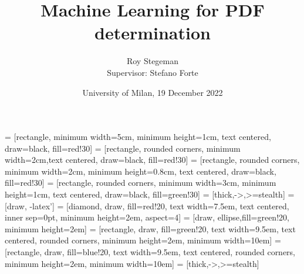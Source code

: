 

\title{
  Machine Learning for PDF determination
}
\date{University of Milan, 19 December 2022}
\author{
  Roy Stegeman \\[0.1cm]
  Supervisor: Stefano Forte
}


\usetikzlibrary{shapes, arrows}
\usetikzlibrary{decorations.pathreplacing}
\usetikzlibrary{positioning, calc}
 = [rectangle, minimum width=5cm, minimum height=1cm, text centered, draw=black, fill=red!30]
 = [rectangle, rounded corners, minimum width=2cm,text centered, draw=black, fill=red!30]
 = [rectangle, rounded corners, minimum width=2cm, minimum height=0.8cm, text centered, draw=black, fill=red!30]
 = [rectangle, rounded corners, minimum width=3cm, minimum height=1cm, text centered, draw=black, fill=green!30]
 = [thick,->,>=stealth]
 =[draw, -latex']
 = [diamond, draw, fill=red!20, text width=7.5em, text centered,  inner sep=0pt, minimum height=2em, aspect=4]
 = [draw, ellipse,fill=green!20, minimum height=2em]
 = [rectangle, draw, fill=green!20, text width=9.5em, text centered, rounded corners, minimum height=2em, minimum width=10em]
=[rectangle, draw, fill=blue!20, text width=9.5em,
                   text centered, rounded corners, minimum height=2em,
                   minimum width=10em]
 = [thick,->,>=stealth]








{
\begin{frame}
  \titlepage
\end{frame}
}

